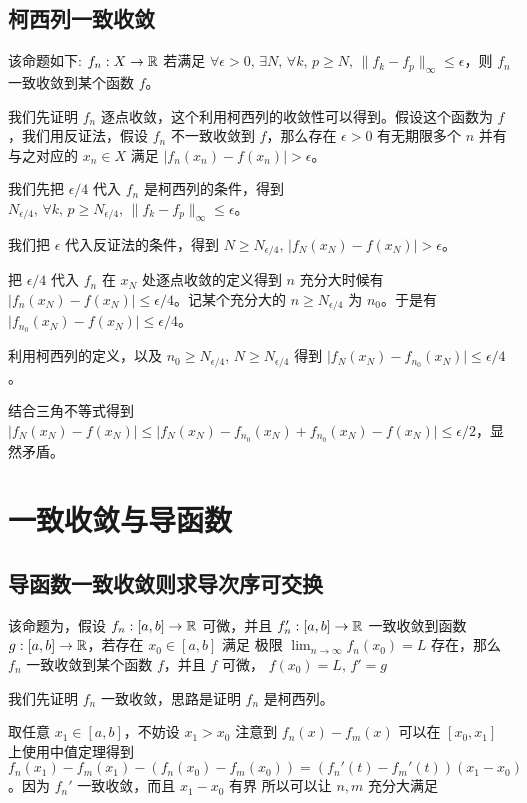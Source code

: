 \subsection{柯西列一致收敛}

该命题如下: $f_n: X \to \mathbb{R}$ 若满足 $\forall \epsilon > 0,\, \exists N,\, \forall k,\,p \ge N,\, \| f_k - f_p \|_{\infty} \le \epsilon$，则 $f_n$ 一致收敛到某个函数 $f$。

我们先证明 $f_n$ 逐点收敛，这个利用柯西列的收敛性可以得到。假设这个函数为 $f$，我们用反证法，假设 $f_n$ 不一致收敛到 $f$，那么存在 $\epsilon > 0$ 有无期限多个 $n$ 并有与之对应的 $x_n \in X$ 满足 $\lvert f_n(x_n) - f(x_n) \rvert > \epsilon$。

我们先把 $\epsilon /4$ 代入 $f_n$ 是柯西列的条件，得到 $N_{\epsilon/4},\, \forall k,\,p \ge N_{\epsilon/4},\, \| f_k - f_p \|_{\infty} \le \epsilon$。

我们把 $\epsilon$ 代入反证法的条件，得到 $N \ge N_{\epsilon/4},\, \lvert f_N(x_N) - f(x_N) \rvert > \epsilon$。

把 $\epsilon/4$ 代入 $f_n$ 在 $x_N$ 处逐点收敛的定义得到 $n$ 充分大时候有
$\lvert f_n(x_N) - f(x_N) \rvert \le \epsilon/4$。记某个充分大的 $n \ge N_{\epsilon/4}$ 为 $n_0$。于是有 $\lvert f_{n_0}(x_N) - f(x_N) \rvert \le \epsilon /4$。

利用柯西列的定义，以及 $n_0 \ge N_{\epsilon /4},\, N \ge N_{\epsilon/4}$ 得到 $\lvert f_N(x_N) - f_{n_0}(x_N)\rvert \le \epsilon/4$。

结合三角不等式得到 $\lvert f_N(x_N) - f(x_N) \rvert \le \lvert f_N(x_N) - f_{n_0}(x_N) + f_{n_0}(x_N) - f(x_N)\rvert \le \epsilon/2$，显然矛盾。


\section{一致收敛与导函数}

\subsection{导函数一致收敛则求导次序可交换}

该命题为，假设 $f_n: [a,b] \to \mathbb{R}$ 可微，并且 $f_n': [a,b] \to \mathbb{R}$ 一致收敛到函数 $g: [a,b] \to \mathbb{R}$，若存在 $x_0 \in [a,b]$ 满足 极限 $\lim_{n \to \infty} f_n(x_0) = L$ 存在，那么 $f_n$ 一致收敛到某个函数 
$f$，并且 $f$ 可微， $f(x_0) = L,\, f' =g$

我们先证明 $f_n$  一致收敛，思路是证明 $f_n$ 是柯西列。

取任意 $x_1 \in [a,b]$，不妨设 $x_1 > x_0$ 注意到 $f_n(x) - f_m(x)$ 可以在 $[x_0, x_1]$ 上使用中值定理得到 $f_n(x_1) - f_m(x_1) - (f_n(x_0) -f_m(x_0)) = (f_n'(t) - f_m'(t))(x_1 - x_0)$。因为 $f_n'$ 一致收敛，而且 $x_1 - x_0 $ 有界 所以可以让 $n,m$ 充分大满足 


